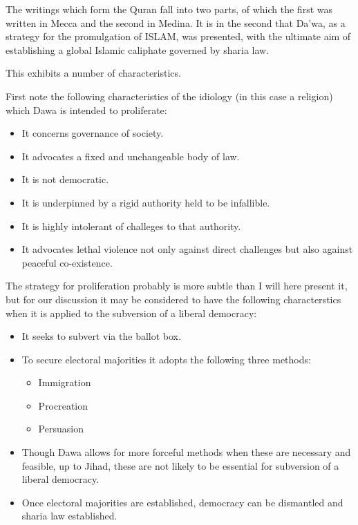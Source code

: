 \documentclass[10pt,titlepage]{book}
\begin{document}
The writings which form the Quran fall into two parts, of which the first was written in Mecca and the second in Medina.
It is in the second that Da'wa, as a strategy for the promulgation of ISLAM, was presented, with the ultimate aim of establishing a global Islamic caliphate governed by sharia law.

This exhibits a number of characteristics.

First note the following characteristics of the idiology (in this case a religion) which Dawa is intended to proliferate:

\begin{itemize}
\item It concerns governance of society.
\item It advocates a fixed and unchangeable body of law.
\item It is not democratic.
\item It is underpinned by a rigid authority held to be infallible.
\item It is highly intolerant of challeges to that authority.
\item It advocates lethal violence not only against direct challenges but also against peaceful co-existence.
\end{itemize}

The strategy for proliferation probably is more subtle than I will here present it, but for our discussion it may be considered to have the following characterstics when it is applied to the subversion of a liberal democracy:

\begin{itemize}
\item It seeks to subvert via the ballot box.
\item To secure electoral majorities it adopts the following three methods:
  \begin{itemize}
  \item Immigration
  \item Procreation
  \item Persuasion
\end{itemize}
\item Though Dawa allows for more forceful methods when these are necessary and feasible, up to Jihad, these are not likely to be essential for subversion of a liberal democracy.
\item Once electoral majorities are established, democracy can be dismantled and sharia law established.
\end{itemize}
\end{document}
